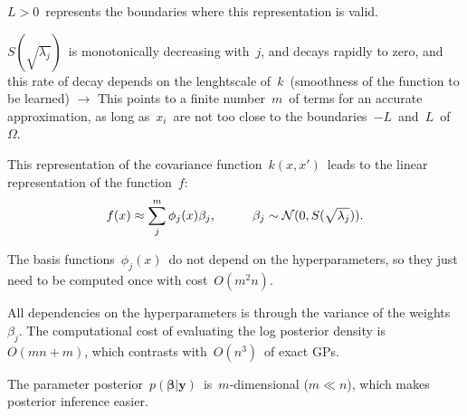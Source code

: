 \documentclass[landscape,a1,final]{a0poster} %
\let\tempone\itemize
\let\temptwo\enditemize
\renewenvironment{itemize}{\tempone\addtolength{\itemsep}{-0.3\baselineskip}}{\temptwo}
\begin{document}
\begin{minipage}{1\linewidth}
\begin{minipage}[t]{0.31\textwidth}
\begin{itemize}
\item $L > 0$\, represents the {\color{navyblue} boundaries} where this representation is valid.

\item $S(\sqrt{\lambda_j})$\, is monotonically decreasing with\, $j$, and decays rapidly to zero, and this rate of decay depends on the lenghtscale of\, $k$\, (smoothness of the function to be learned) \; $\rightarrow$ \; This points to {\color{navyblue} a finite number}\, $m$\, {\color{navyblue} of terms for an accurate approximation}, as long as\, $x_i$\, are not too close to the boundaries\, $-L$\, and\, $L$\, of\, $\Omega$.

\item This representation of the covariance function\, $k(x,x')$\, leads to the {\color{navyblue} linear representation} of the function\, $f$:
%
\begin{align*}
f(x) \approx \sum_{j}^m \phi_j(x) \beta_j, \hspace{10mm} \beta_j \sim \mathcal{N}(0,S(\sqrt{\lambda_j})).
\end{align*}
\end{itemize}

\vspace{-0.5cm}
\begin{tcolorbox}[colframe=blue!20, colback=white, title=\scriptsize Properties of the HSGP method, colbacktitle=lightblue, coltitle=black, boxrule=0.5pt]
\begin{itemize}\setlength\itemsep{2mm}
\item[+] The basis functions\, $\phi_j(x)$\, do not depend on the hyperparameters, so they just need to be computed once with cost\, $O(m^2n)$.

\item[+]  All dependencies on the hyperparameters is through the variance of the weights\, $\beta_j$. The computational cost of evaluating the log posterior density is\, $O(mn+m)$, which contrasts with\, $O(n^3)$\, of exact GPs.


\item[+] The parameter posterior\, $p(\bm{\beta}|\bm{y})$\, is\, $m$-dimensional ($m\ll n$), which makes posterior inference easier.


\end{itemize}
\end{tcolorbox}
\end{minipage}
\end{minipage}
\end{document}
